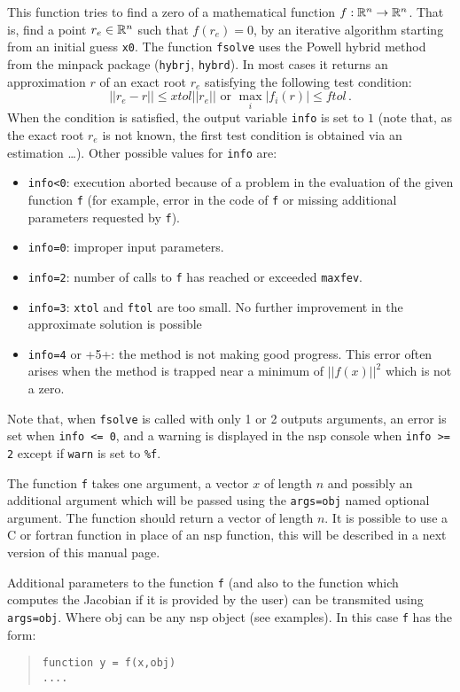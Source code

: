 \begin{mandescription}
This function tries to find a zero of a mathematical function $f: {\mathbb R}^n \rightarrow  {\mathbb R}^n$.
That is, find a point $r_e \in {\mathbb R}^n$ such that $f(r_e)=0$, by an iterative algorithm starting from an initial guess \verb+x0+.
The function \verb+fsolve+ uses the Powell hybrid method from the minpack package (\verb+hybrj+, \verb+hybrd+). 
In most cases it returns an approximation $r$ of an exact root $r_e$ satisfying the following test condition:  
$$
|| r_e - r || \le xtol || r_e || \mbox{ or } \max_i | f_i(r) | \le ftol\,.
$$
When the condition is satisfied, the output variable \verb+info+ is set to $1$ (note that, as the exact root  $r_e$
is not known, the first test condition is obtained via an estimation \ldots). Other possible values
for \verb+info+ are:
\begin{itemize}
\item \verb+info<0+: execution aborted because of a problem in the evaluation of the given function \verb+f+ 
  (for example, error in the code of \verb+f+ or missing additional parameters requested by \verb+f+).
\item \verb+info=0+: improper input parameters.
\item \verb+info=2+: number of calls to \verb+f+ has reached or exceeded \verb+maxfev+.
\item \verb+info=3+: \verb+xtol+ and \verb+ftol+ are too small. No further improvement in the approximate solution is possible
\item \verb+info=4+ or +5+: the method is not making good progress. This error often arises when the method
  is trapped near a minimum of $||f(x)||^2$ which is not a zero.
\end{itemize}
Note that, when \verb+fsolve+ is called with only 1 or 2 outputs arguments, an error is set 
when \verb+info <= 0+, and a warning is displayed in the nsp console when \verb+info >= 2+ except 
if \verb+warn+ is set to \verb+%f+. 

The function \verb+f+ takes one argument, a vector $x$ of length $n$ and possibly an additional
argument which will be passed using the \verb+args=obj+ named optional argument. The function
should return a vector of length $n$. It is possible to use a C or fortran function in place
of an nsp function, this will be described in a next version of this manual page.

Additional parameters to the function \verb+f+ (and also to the function which computes the Jacobian 
if it is provided by the user) can be transmited using \verb+args=obj+. Where obj can be any nsp 
object (see examples). In this case \verb+f+ has the form:
\begin{quote}
{\tt function y = f(x,obj) \\
      ....}
\end{quote}


\end{mandescription}
